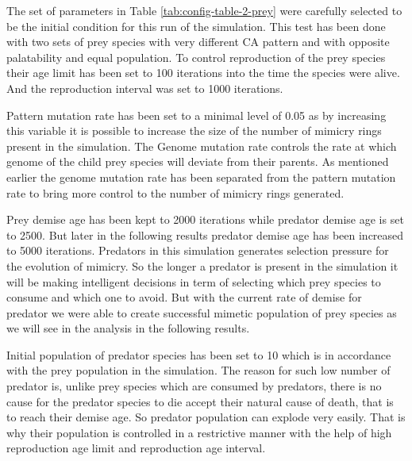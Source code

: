 The set of parameters in Table \ref{tab:config-table-2-prey} were carefully selected to be the initial condition for this run of the simulation. This test has been done with two sets of prey species with very different CA pattern and with opposite palatability and equal population. To control reproduction of the prey species their age limit has been set to 100 iterations into the time the species were alive. And the reproduction interval was set to 1000 iterations.

Pattern mutation rate has been set to a minimal level of 0.05 as by increasing this variable it is possible to increase the size of the number of mimicry rings present in the simulation. The Genome mutation rate controls the rate at which genome of the child prey species will deviate from their parents. As mentioned earlier the genome mutation rate has been separated from the pattern mutation rate to bring more control to the number of mimicry rings generated.

Prey demise age has been kept to 2000 iterations while predator demise age is set to 2500. But later in the following results predator demise age has been increased to 5000 iterations. Predators in this simulation generates selection pressure for the evolution of mimicry. So the longer a predator is present in the simulation it will be making intelligent decisions in term of selecting which prey species to consume and which one to avoid. But with the current rate of demise for predator we were able to create successful mimetic population of prey species as we will see in the analysis in the following results.

Initial population of predator species has been set to 10 which is in accordance with the prey population in the simulation. The reason for such low number of predator is, unlike prey species which are consumed by predators, there is no cause for the predator species to die accept their natural cause of death, that is to reach their demise age. So predator population can explode very easily. That is why their population is controlled in a restrictive manner with the help of high reproduction age limit and reproduction age interval.

